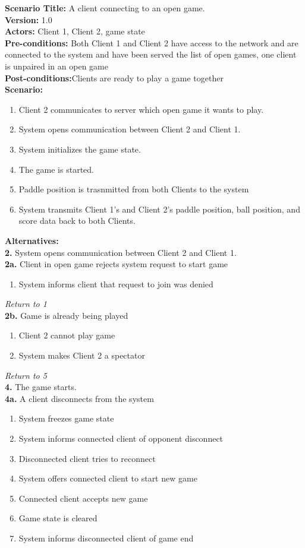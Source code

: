 \documentclass[letterpaper,12pt]{article}
\begin{document}
\noindent \textbf{Scenario Title:} A client connecting to an open game.\\
\textbf{Version:} 1.0\\
\textbf{Actors:} Client 1, Client 2, game state\\
\textbf{Pre-conditions:} Both Client 1 and Client 2 have access to the network and are connected to the system and have been served the list of open games, one client is unpaired in an open game\\
\textbf{Post-conditions:}Clients are ready to play a game together\\
\textbf{Scenario:}
\begin{enumerate}
\item Client 2 communicates to server which open game it wants to play.
\item System opens communication between Client 2 and Client 1.
\item System initializes the game state.
\item The game is started.
\item Paddle position is trasnmitted from both Clients to the system
\item System transmits Client 1's and Client 2's paddle position, ball position, and score data back to both Clients.
\end{enumerate}
\textbf{Alternatives:}\\
\textbf{2.} System opens communication between Client 2 and Client 1.\\
\textbf{2a.} Client in open game rejects system request to start game 
\begin{enumerate}
\item System informs client that request to join was denied
\end{enumerate}
\emph{Return to 1}\\
\textbf{2b.} Game is already being played
\begin{enumerate}
\item Client 2 cannot play game
\item System makes Client 2 a spectator
\end{enumerate}
\emph{Return to 5}\\
\textbf{4.} The game starts.\\
\textbf{4a.} A client disconnects from the system
\begin{enumerate}
\item System freezes game state
\item System informs connected client of opponent disconnect
\item Disconnected client tries to reconnect
\item System offers connected client to start new game
\item Connected client accepts new game
\item Game state is cleared
\item System informs disconnected client of game end
\end{enumerate}
\end{document}
